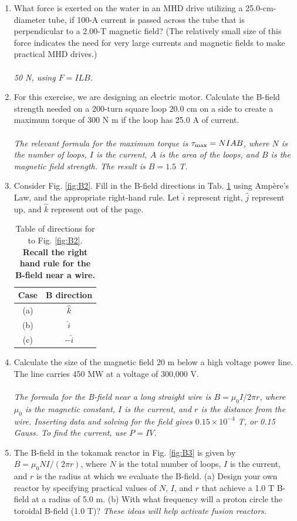 \documentclass[12pt,twocolumn]{article}
\begin{document}
\begin{enumerate}
\item What force is exerted on the water in an MHD drive utilizing a 25.0-cm-diameter tube, if 100-A current is passed across the tube that is perpendicular to a 2.00-T magnetic field? (The relatively small size of this force indicates the need for very large currents and magnetic fields to make practical MHD drives.) \\ \\
\textit{50 N, using $F = ILB$.}
\item For this exercise, we are designing an electric motor.  Calculate the B-field strength needed on a 200-turn square loop 20.0 cm on a side to create a maximum torque of 300 N m if the loop has 25.0 A of current.  \\ \\
\textit{The relevant formula for the maximum torque is $\tau_{\rm max} = NIAB$, where $N$ is the number of loops, $I$ is the current, $A$ is the area of the loops, and $B$ is the magnetic field strength.  The result is $B = 1.5$ T.}
\item Consider Fig. \ref{fig:B2}.  Fill in the B-field directions in Tab. \ref{tab:ex2} using Amp\`{e}re's Law, and the appropriate right-hand rule. Let $\hat{i}$ represent right, $\hat{j}$ represent up, and $\hat{k}$ represent out of the page.
\begin{table}
\centering
\begin{tabular}{| c | c |}
\hline
Case & B direction \\ \hline
(a) & $\hat{k}$ \\ \hline
(b) & $\hat{i}$ \\ \hline
(c) & $-\hat{i}$ \\ \hline
\end{tabular}
\caption{\label{tab:ex2} Table of directions for to Fig. \ref{fig:B2}. \textbf{Recall the right hand rule for the B-field near a wire.}}
\end{table}
\item Calculate the size of the magnetic field 20 m below a high voltage power line. The line carries 450 MW at a voltage of 300,000 V. \\ \\
\textit{The formula for the B-field near a long straight wire is $B = \mu_0 I/2\pi r$, where $\mu_0$ is the magnetic constant, $I$ is the current, and $r$ is the distance from the wire.  Inserting data and solving for the field gives $0.15 \times 10^{-4}$ T, or 0.15 Gauss.  To find the current, use $P = IV$.}
\item The B-field in the tokamak reactor in Fig. \ref{fig:B3} is given by $B = \mu_0 N I / (2\pi r)$, where $N$ is the total number of loops, $I$ is the current, and $r$ is the radius at which we evaluate the B-field.  (a) Design your own reactor by specifying practical values of $N$, $I$, and $r$ that achieve a 1.0 T B-field at a radius of 5.0 m.  (b) With what frequency will a proton circle the toroidal B-field (1.0 T)?  \textit{These ideas will help activate fusion reactors.} \\ \\

\end{enumerate}
\end{document}
